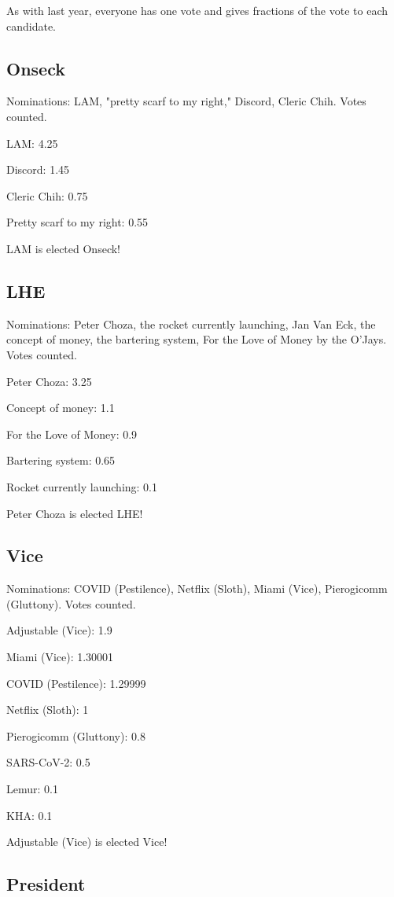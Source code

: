 \documentclass[10pt]{article}
\begin{document}
As with last year, everyone has one vote and gives fractions of the vote to each candidate.

\subsection{Onseck}

Nominations: LAM, "pretty scarf to my right," Discord, Cleric Chih. Votes counted.

LAM: 4.25

Discord: 1.45

Cleric Chih: 0.75

Pretty scarf to my right: 0.55

LAM is elected Onseck!

\subsection{LHE}

Nominations: Peter Choza, the rocket currently launching, Jan Van Eck, the concept of money, the bartering system, For the Love of Money by the O'Jays. Votes counted.

Peter Choza: 3.25

Concept of money: 1.1

For the Love of Money: 0.9

Bartering system: 0.65

Rocket currently launching: 0.1

Peter Choza is elected LHE!

\subsection{Vice}

Nominations: COVID (Pestilence), Netflix (Sloth), Miami (Vice), Pierogicomm (Gluttony). Votes counted.

Adjustable (Vice): 1.9

Miami (Vice): 1.30001

COVID (Pestilence): 1.29999

Netflix (Sloth): 1

Pierogicomm (Gluttony): 0.8

SARS-CoV-2: 0.5

Lemur: 0.1

KHA: 0.1

Adjustable (Vice) is elected Vice!

\subsection{President}
\end{document}
